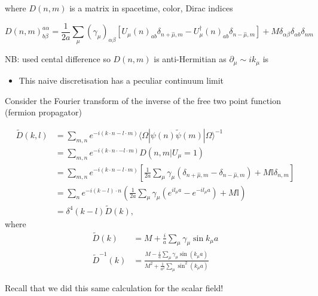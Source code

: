 where \(D(n, m)\) is a matrix in spacetime, color, Dirac indices

\begin{equation}
D(n,m)_{b \beta}^{a \alpha}=\frac{1}{2 a} \sum_{\mu}\left(\gamma_{\mu}\right)_{\alpha \beta}\left[U_{\mu}(n)_{a b} \delta_{n+\hat{\mu}, m}-U_{\mu}^{\dagger}(n)_{a b} \delta_{n-\hat{\mu}, m}\right]+M \delta_{\alpha \beta} \delta_{\alpha b} \delta_{nm}
\end{equation}

NB: used cental difference so \(D(n, m)\) is anti-Hermitian as \(\partial_{\mu} \sim i k_{\mu}\) is

\begin{itemize}
  \item This naive discretisation has a peculiar continuum limit 
\end{itemize}

Consider the Fourier transform of the inverse of the free two point function (fermion propagator)

\begin{equation}
\begin{aligned}
 \tilde{D}(k, l)&=\sum_{m, n} e^{-i(k \cdot n-l \cdot m)}\langle\Omega| \psi(n) \tilde{\psi}(m)|\Omega\rangle^{-1} \\
& =\sum_{m,n} e^{-i(k \cdot n \cdot - l \cdot m)} D(n,m | U_\mu = 1) \\
& = \sum_{m,n} e^{-i(k \cdot n - l \cdot m)}\left[ \frac{1}{2 a} \sum_\mu \gamma_\mu (\delta_{n + \hat{\mu}, m} - \delta_{n - \hat{\mu}, m}) + M \mathbb{I} \delta_{n,m}\right]\\
& = \sum_n e^{- i (k - l)\cdot n} \left( \frac{1}{2a}\sum_\mu \gamma_\mu ( e^{i l_\mu a}- e^{- i l_\mu a}) + M \mathbb{I}\right)\\
& = \delta^4(k-l)\tilde{D}(k), 
\end{aligned}
\end{equation}
where
\begin{equation}
\begin{aligned}
\tilde{D}(k) &= M + \frac{i}{a}\sum_\mu \gamma_\mu \sin k_\mu a\\
\tilde{D}^{-1}(k) &= \frac{M - \frac{i}{a}\sum_\mu \gamma_\mu \sin (k_\mu a)}{M^2 + \frac{1}{a^2} \sum_\mu \sin^2(k_\mu a)}
\end{aligned}
\end{equation}

Recall that we did this same calculation for the scalar field!

